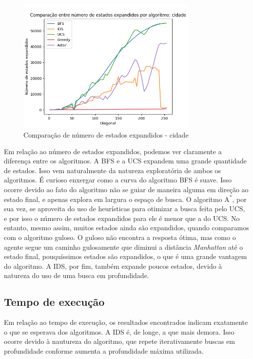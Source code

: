 \documentclass{article}
\begin{document}
\begin{figure}[H]
	\centering
	\includegraphics[width=0.8\textwidth]{../images/cidade_state_benchmark.png}
	\caption{Comparação de número de estados expandidos - cidade}
\end{figure}

Em relação ao número de estados expandidos, podemos ver claramente a diferença entre os algoritmos. A BFS e a UCS expandem uma grande quantidade de estados. Isso vem naturalmente da natureza exploratória de ambos
os algoritmos. É curioso enxergar como a curva do algoritmo BFS é suave. Isso ocorre devido ao fato do algoritmo não se guiar de maneira alguma em direção ao estado final, e apenas explora em largura o espaço de busca.
O algoritmo \(\text{A}^*\), por sua vez, se aproveita do uso de heurísticas para otimizar a busca feita pelo UCS, e por isso o número de estados expandidos para ele é menor que a do UCS. No entanto, mesmo assim, muitos estados
ainda são expandidos, quando comparamos com o algoritmo guloso. O guloso não encontra a resposta ótima, mas como o agente segue um caminho gulosamente que diminui a distância \textit{Manhattan} até o estado final, pouquíssimos
estados são expandidos, o que é uma grande vantagem do algoritmo. A IDS, por fim, também expande poucos estados, devido à natureza do uso de uma busca em profundidade.

\subsection{Tempo de execução}

Em relação ao tempo de execução, os resultados encontrados indicam exatamente o que se esperava dos algoritmos. A IDS é, de longe, a que mais demora. Isso ocorre devido à nautureza do algoritmo,
que repete iterativamente buscas em profundidade conforme aumenta a profundidade máxima utilizada.
\end{document}
